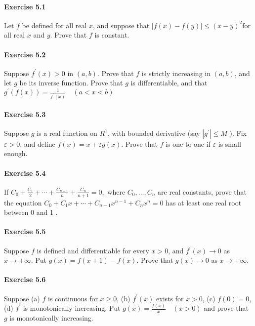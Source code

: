 \documentclass{article}
\begin{document}
\paragraph{Exercise 5.1} Let $f$ be defined for all real $x$, and suppose that $|f(x)-f(y)| \leq(x-y)^{2}$for all real $x$ and $y$. Prove that $f$ is constant.

\paragraph{Exercise 5.2} Suppose $f^{\prime}(x)>0$ in $(a, b)$. Prove that $f$ is strictly increasing in $(a, b)$, and let $g$ be its inverse function. Prove that $g$ is differentiable, and that$g^{\prime}(f(x))=\frac{1}{f^{\prime}(x)} \quad(a<x<b)$

\paragraph{Exercise 5.3} Suppose $g$ is a real function on $R^{1}$, with bounded derivative (say $\left|g^{\prime}\right| \leq M$ ). Fix $\varepsilon>0$, and define $f(x)=x+\varepsilon g(x)$. Prove that $f$ is one-to-one if $\varepsilon$ is small enough.

\paragraph{Exercise 5.4} If $C_{0}+\frac{C_{1}}{2}+\cdots+\frac{C_{n-1}}{n}+\frac{C_{n}}{n+1}=0,$ where $C_{0}, \ldots, C_{n}$ are real constants, prove that the equation $C_{0}+C_{1} x+\cdots+C_{n-1} x^{n-1}+C_{n} x^{n}=0$ has at least one real root between 0 and 1 .

\paragraph{Exercise 5.5} Suppose $f$ is defined and differentiable for every $x>0$, and $f^{\prime}(x) \rightarrow 0$ as $x \rightarrow+\infty$. Put $g(x)=f(x+1)-f(x)$. Prove that $g(x) \rightarrow 0$ as $x \rightarrow+\infty$.

\paragraph{Exercise 5.6} Suppose (a) $f$ is continuous for $x \geq 0$, (b) $f^{\prime}(x)$ exists for $x>0$, (c) $f(0)=0$, (d) $f^{\prime}$ is monotonically increasing. Put $g(x)=\frac{f(x)}{x} \quad(x>0)$ and prove that $g$ is monotonically increasing.
\end{document}
